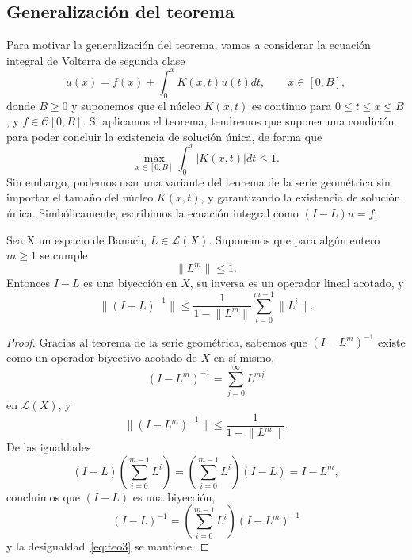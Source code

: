 \subsection{Generalización del teorema}
Para motivar la generalización del teorema, vamos a considerar la ecuación integral de Volterra de segunda clase
\begin{equation}
	u(x) = f(x) + \int_{0}^{x} K(x,t)u(t)dt, \qquad x \in [0,B],
\end{equation}
donde $B \geq 0$ y suponemos que el núcleo $K(x,t)$ es continuo para $0 \leqslant t \leqslant x \leqslant B$, y $f \in \mathcal{C}[0,B]$. Si aplicamos el teorema, tendremos que suponer una condición para poder concluir la existencia de solución única, de forma que
\begin{equation}
	\max_{x\in [0,B]}\int_{0}^{x} |K(x,t)|dt \leq 1.
\end{equation}
Sin embargo, podemos usar una variante del teorema de la serie geométrica sin importar el tamaño del núcleo $K(x,t)$, y garantizando la existencia de solución única. Simbólicamente, escribimos la ecuación integral como $(I-L)u = f$.
\begin{corolario}
	Sea X un espacio de Banach, $L \in \mathcal{L}(X)$. Suponemos que para algún entero $m \geqslant 1$ se cumple
	\begin{equation}
		\lVert L^m \rVert \leq 1.
	\end{equation}
	Entonces $I - L$ es una biyección en $X$, su inversa es un operador lineal acotado, y 
	\begin{equation}\label{eq:teo3}
		\lVert (I-L)^{-1} \rVert \leqslant \dfrac{1}{1 - \lVert L^m \rVert} \sum_{i=0}^{m - 1}\lVert L^i \rVert.
	\end{equation}
\end{corolario}
\begin{proof}
	Gracias al teorema de la serie geométrica, sabemos que $(I-L^m)^{-1}$ existe como un operador biyectivo acotado de $X$ en sí mismo,
	\begin{equation}
		(I - L^m)^{-1} = \sum_{j=0}^{\infty}L^{mj} 
	\end{equation}
	en $\mathcal{L}(X)$, y
	\begin{equation}
		\lVert (I - L^m)^{-1} \rVert \leqslant \dfrac{1}{1 - \lVert L^m \rVert}.
	\end{equation}
	De las igualdades
	\begin{equation}
		(I - L)(\sum_{i=0}^{m - 1}L^i) = (\sum_{i=0}^{m - 1}L^i)(I-L) = I - L^m,
	\end{equation}
	concluimos que $(I-L)$ es una biyección,
	\begin{equation}
		(I-L)^{-1} = (\sum_{i=0}^{m-1}L^i)(I-L^m)^{-1}
	\end{equation}
	y la desigualdad~\eqref{eq:teo3} se mantiene.
\end{proof}
